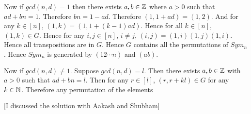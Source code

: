 \documentclass[a4paper, 11pt]{article}
\newcounter{problem}
\begin{document}
{\begin{itemize}
Now if $gcd(n,d)=1$ then there exists $a,b\in \mathbb{Z}$ where $a>0$ such that  $ad+bn=1$. Therefore $bn=1-ad$. Therefore $(1,1+ad)=(1,2)$. And for any $k\in [n]$, $(1,k)=(1,1+(k-1)ad)$. Hence for all $k\in[n]$, $(1,k)\in G$. Hence for any $i,j\in[n]$, $i\neq j$, $(i,j)=(1,i)(1,j)(1,i)$. Hence all transpositions are in $G$. Hence $G$ contains all the permutations of $Sym_n$. Hence $Sym_n$ is generated by $(12\cdots n)$ and $(ab)$.

Now if $gcd(n,d)\neq 1$. Suppose $gcd(n,d)=l$. Then there exists $a,b\in\mathbb{Z}$ with $a>0$ such that $ad+bn=l$. Then  for any $r\in [l]$, $(r,r+kl)\in G$ for any $k\in \mathbb{N}$.  Therefore any permutation of the elements 
\end{itemize}
}
\parinf

[I discussed the solution with Aakash and Shubham]\parinn\textbf{}



\end{document}
